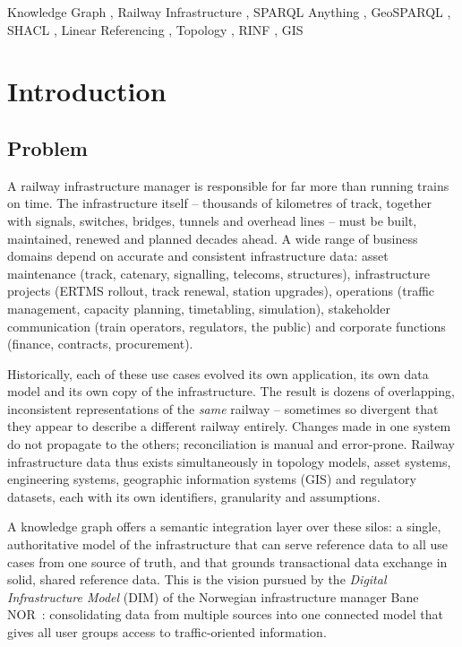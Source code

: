 \documentclass{ceurart}
\begin{document}
\begin{keywords}
  Knowledge Graph \sep
  Railway Infrastructure \sep
  SPARQL Anything \sep
  GeoSPARQL \sep
  SHACL \sep
  Linear Referencing \sep
  Topology \sep
  RINF \sep
  GIS 
\end{keywords}

\maketitle

\section{Introduction}

\subsection{Problem}

A railway infrastructure manager is responsible for far more than running
trains on time. The infrastructure itself -- thousands of kilometres of track,
together with signals, switches, bridges, tunnels and overhead lines -- must be
built, maintained, renewed and planned decades ahead. A wide range of business
domains depend on accurate and consistent infrastructure data: asset
maintenance (track, catenary, signalling, telecoms, structures), infrastructure
projects (ERTMS rollout, track renewal, station upgrades), operations (traffic
management, capacity planning, timetabling, simulation), stakeholder
communication (train operators, regulators, the public) and corporate functions
(finance, contracts, procurement).

Historically, each of these use cases evolved its own application, its own data
model and its own copy of the infrastructure. The result is dozens of
overlapping, inconsistent representations of the \emph{same} railway --
sometimes so divergent that they appear to describe a different railway
entirely. Changes made in one system do not propagate to the others;
reconciliation is manual and error-prone. Railway infrastructure data thus
exists simultaneously in topology models, asset systems, engineering systems,
geographic information systems (GIS) and regulatory datasets, each with its own
identifiers, granularity and assumptions.

A knowledge graph offers a semantic integration layer over these silos: a
single, authoritative model of the infrastructure that can serve reference data
to all use cases from one source of truth, and that grounds transactional data
exchange in solid, shared reference data. This is the vision pursued by the
\emph{Digital Infrastructure Model} (DIM) of the Norwegian infrastructure
manager Bane NOR~\cite{dim}: consolidating data from multiple sources into one
connected model that gives all user groups access to traffic-oriented
information.
\end{document}
